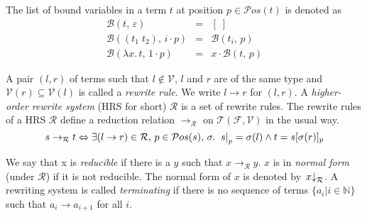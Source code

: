 
The list of bound variables in a term $t$ at position $p \in \mathcal{P}os(t)$ is denoted as
$$
\begin{array}{lcl}
\mathcal{B}(t,\,\varepsilon) &=& [\;]\\
\mathcal{B}((t_1 \; t_2),\,i \cdot p) &=& \mathcal{B}(t_i,\, p)\\
\mathcal{B}(\lambda x.\, t,\,1 \cdot p) &=& x \cdot \mathcal{B}(t,\, p)
\end{array}
$$

A pair $(l,r)$ of terms such that $l \notin \mathcal{V}$, $l$ and $r$ are of the same type and $\mathcal{V}(r) \subseteq \mathcal{V}(l)$ is called a {\em rewrite rule}. We write $l \to r$ for $(l,r)$. A {\em higher-order rewrite system} (HRS for short) $\mathcal{R}$ is a set of rewrite rules.
The rewrite rules of a HRS $\mathcal{R}$ define a reduction relation $\to_{\mathcal{R}}$ on $\mathcal{T}(\mathcal{F},\mathcal{V})$ in the usual way.
$$ s \to_{\mathcal{R}} t \Leftrightarrow \exists (l \to r) \in \mathcal{R},\, p \in \mathcal{P}os(s),\, \sigma.\; \left. s \right|_{p} = \sigma(l) \wedge t = s[\sigma(r)]_{p}$$

We say that x is {\em reducible} if there is a $y$ such that $x \to_{\mathcal{R}} y$. $x$ is in {\em normal form} (under $\mathcal{R}$) if it is not reducible. The normal form of $x$ is denoted by $\left. x \right\downarrow_{\mathcal{R}}$. A rewriting system is called {\em terminating} if there is no sequence of terms $\{a_i | i \in \mathbb{N}\}$ such that $a_i \to a_{i+1}$ for all $i$.


